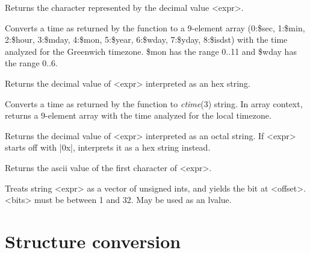 \begin{enum}{1cm}

Returns the character represented by the decimal value <expr>.\ddag

Converts a time as returned by the  function to a 9-element
array (0:\$sec, 1:\$min, 2:\$hour, 3:\$mday, 4:\$mon, 5:\$year, 6:\$wday,
7:\$yday, 8:\$isdst) with the time analyzed for the Greenwich timezone.
\$mon has the range 0..11 and \$wday has the range 0..6.

Returns the decimal value of <expr> interpreted as an hex string.

Converts a time as returned by the  function to {\it ctime\/}(3)
string. In array context, returns a 9-element
array with the time analyzed for the local timezone. 

Returns the decimal value of <expr> interpreted as an octal string. If
<expr> starts off with |0x|, interprets it as a hex string instead.

Returns the ascii value of the first character of <expr>.

Treats string <expr> as a vector of unsigned ints, and yields the bit at
<offset>. <bits> must be between 1 and 32. May be used as an lvalue.

\end{enum}

\newpage

\section{Structure conversion} 

